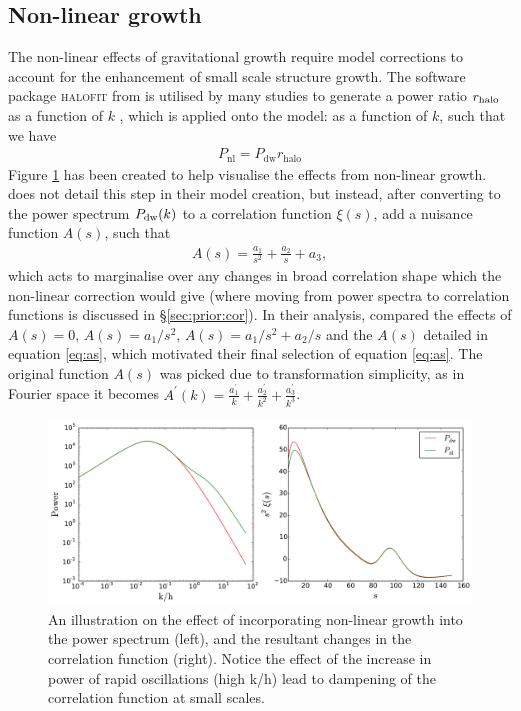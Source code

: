 \documentclass[titlesmallcaps, examinerscopy, copyrightpage]{uqthesis}
\newcommand{\halofit}{\textsc{halofit}}
\begin{document}
\subsection{Non-linear growth}

The non-linear effects of gravitational growth require model corrections to account for the enhancement of small scale structure growth. The software package \halofit{} from \citet{Smith2003} is utilised by many studies to generate a power ratio $r_{\rm{halo}}$ as a function of $k$ \citep{ReidPercival2010, BlakeDavis2011, ChuangWang2012}, which is applied onto the model:
 as a function of $k$, such that we have
\begin{align}
P_{\text{nl}} = P_{\text{dw}} r_{\text{halo}}
\end{align}
Figure \ref{fig:nlExample} has been created to help visualise the effects from non-linear growth. \citet{XuPadmanabhan2012} does not detail this step in their model creation, but instead, after converting to the power spectrum $P_{\rm{dw}}(k)$ to a correlation function $\xi(s)$, add a nuisance function $A(s)$, such that
\begin{align} \label{eq:as}
A(s) = \frac{a_1}{s^2} + \frac{a_2}{s} + a_3,
\end{align}
which acts to marginalise over any changes in broad correlation shape which the non-linear correction would give (where moving from power spectra to correlation functions is discussed in \S\ref{sec:prior:cor}). In their analysis, \citet{XuPadmanabhan2012} compared the effects of $A(s) = 0$, $A(s) = a_1 / s^2$, $A(s) = a_1 / s^2 + a_2 / s$ and the $A(s)$ detailed in equation \eqref{eq:as}, which motivated their final selection of equation \eqref{eq:as}. The original function $A(s)$ was picked due to transformation simplicity, as in Fourier space it becomes $A^\prime(k) = \frac{a^\prime_1}{k} + \frac{a^\prime_2}{k^2} + \frac{a^\prime_3}{k^3}$.



\begin{figure}[h!]
  \begin{center}
    \includegraphics[width=\textwidth]{images/nlExample.pdf}
  \end{center}
  \caption{An illustration on the effect of incorporating non-linear growth into the power spectrum (left), and the resultant changes in the correlation function (right). Notice the effect of the increase in power of rapid oscillations (high k/h) lead to dampening of the correlation function at small scales.}
  \label{fig:nlExample}
\end{figure}
\end{document}
